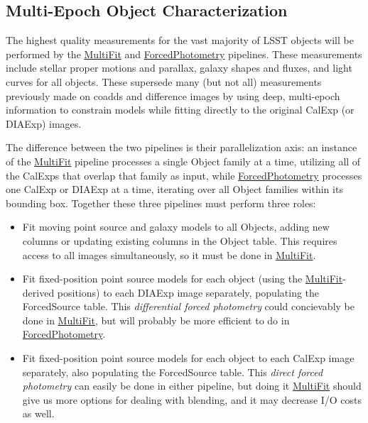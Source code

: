 \subsection{Multi-Epoch Object Characterization}
\label{sec:drp_multi_epoch_object_characterization}

The highest quality measurements for the vast majority of LSST objects will be performed by the \hyperref[sec:drpMultiFit]{MultiFit} and \hyperref[sec:drpForcedPhotometry]{ForcedPhotometry} pipelines.   These measurements include stellar proper motions and parallax, galaxy shapes and fluxes, and light curves for all objects.  These supersede many (but not all) measurements previously made on coadds and difference images by using deep, multi-epoch information to constrain models while fitting directly to the original CalExp (or DIAExp) images.

The difference between the two pipelines is their parallelization axis: an instance of the \hyperref[sec:drpMultiFit]{MultiFit} pipeline processes a single Object family at a time, utilizing all of the CalExps that overlap that family as input, while \hyperref[sec:drpForcedPhotometry]{ForcedPhotometry} processes one CalExp or DIAExp at a time, iterating over all Object families within its bounding box.  Together these three pipelines must perform three roles:
\begin{itemize}
\item Fit moving point source and galaxy models to all Objects, adding new columns or updating existing columns in the Object table.  This requires access to all images simultaneously, so it must be done in \hyperref[sec:drpMultiFit]{MultiFit}.
\item Fit fixed-position point source models for each object (using the \hyperref[sec:drpMultiFit]{MultiFit}-derived positions) to each DIAExp image separately, populating the ForcedSource table.  This \emph{differential forced photometry} could concievably be done in \hyperref[sec:drpMultiFit]{MultiFit}, but will probably be more efficient to do in \hyperref[sec:drpForcedPhotometry]{ForcedPhotometry}.
\item Fit fixed-position point source models for each object to each CalExp image separately, also populating the ForcedSource table.  This \emph{direct forced photometry} can easily be done in either pipeline, but doing it \hyperref[sec:drpMultiFit]{MultiFit} should give us more options for dealing with blending, and it may decrease I/O costs as well.
\end{itemize}

